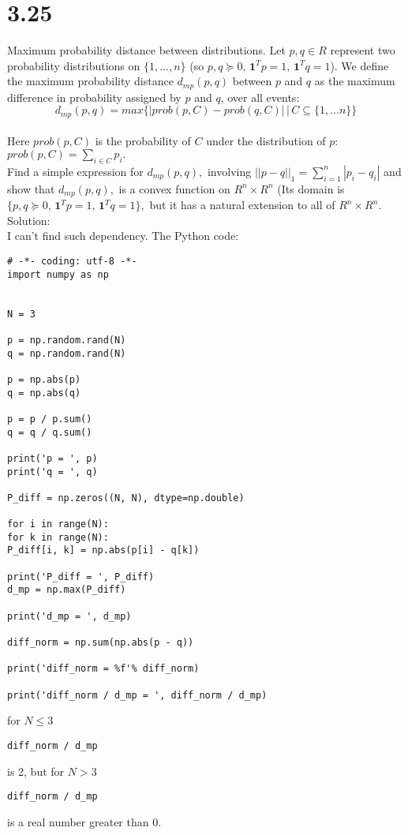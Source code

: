 \documentclass{article}
\begin{document}
\section*{3.25}
Maximum probability distance between distributions. 
Let $p, q \in R $ represent two probability
distributions on $\{1, ..., n\}$ 
(so $p, q \succeq 0, \, \boldsymbol{1}^T p = 1, \, \boldsymbol{1}^T q = 1$). We define the maximum
probability distance $d_{mp}(p, q)$ between $p$ and $q$ as the maximum difference in probability assigned by $p$ and $q$, over all events: \\
$$d_{mp}(p, q) = max\{|prob(p, C) - prob(q, C)| \, | 
\, C \subseteq \{1, ... n\} \} $$ \\
Here $prob(p, C)$ is the probability of $C$ under the distribution of $p$: \\
$prob(p, C) = \sum_{i \in C} p_i.$\\
Find a simple expression for $d_{mp}(p, q),$ involving 
$||p - q||_1 = \sum_{i = 1}^{n} |p_i - q_i|$ and show that
$d_{mp}(p, q),$ is a convex function on $R^n \times R^n$
(Its domain is \\
$\{p, q \succeq 0, \, \boldsymbol{1}^T p = 1, \, \boldsymbol{1}^T q = 1\},$ but
it has a natural extension to all of $R^n \times R^n.$ \\
Solution: \\

I can't find such dependency. The Python code:
\begin{verbatim}
# -*- coding: utf-8 -*-
import numpy as np


N = 3

p = np.random.rand(N)
q = np.random.rand(N)

p = np.abs(p)
q = np.abs(q)

p = p / p.sum()
q = q / q.sum()

print('p = ', p)
print('q = ', q)

P_diff = np.zeros((N, N), dtype=np.double)

for i in range(N):
for k in range(N):
P_diff[i, k] = np.abs(p[i] - q[k])

print('P_diff = ', P_diff)
d_mp = np.max(P_diff)

print('d_mp = ', d_mp)

diff_norm = np.sum(np.abs(p - q))

print('diff_norm = %f'% diff_norm)

print('diff_norm / d_mp = ', diff_norm / d_mp)
\end{verbatim}
for $N \leq 3$ 
\begin{verbatim}
diff_norm / d_mp
\end{verbatim} 
is 2, but for $N > 3$ 
\begin{verbatim}
diff_norm / d_mp
\end{verbatim} 
is a real number greater than 0.
\end{document}
